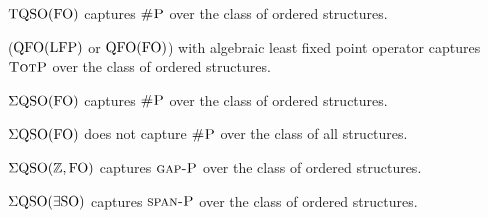 \begin{theorem}
	${\rm TQSO}({\rm FO})$ captures $\text{\sc \#P}$ over the class of ordered structures.
\end{theorem}

\begin{theorem}
	(${\rm QFO}({\rm LFP})$ or ${\rm QFO}({\rm FO})$) with algebraic least fixed point operator captures $\text{\sc TotP}$ over the class of ordered structures.
\end{theorem}
	

\begin{theorem}
$\Sigma{\rm QSO}({\rm FO})$ captures $\text{\sc \#P}$ over the class of ordered structures.
\end{theorem}

\begin{proposition}
$\Sigma{\rm QSO}({\rm FO})$ does not capture $\text{\sc \#P}$ over the class of all structures.
\end{proposition}

\begin{theorem}
$\Sigma{\rm QSO}(\mathbb{Z},{\rm FO})$ captures $\text{\sc gap-P}$ over the class of ordered structures.
\end{theorem}


\begin{theorem}
$\Sigma{\rm QSO}(\exists{\rm SO})$ captures $\text{\sc span-P}$ over the class of ordered structures.
\end{theorem}
